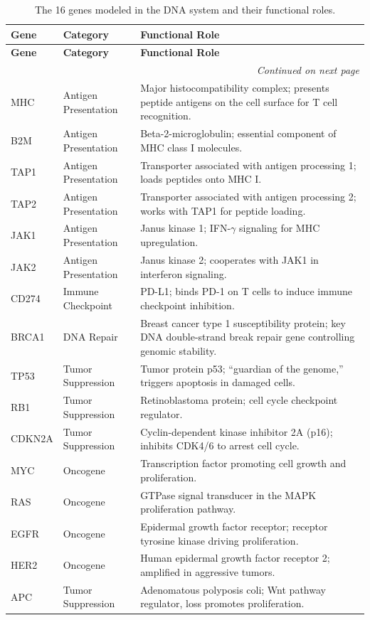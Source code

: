 \begin{longtable}{llp{7.5cm}}
\caption{The 16 genes modeled in the DNA system and their functional roles.}
\label{tab:genes} \\
\toprule
\textbf{Gene} & \textbf{Category} & \textbf{Functional Role} \\
\midrule
\endfirsthead
\toprule
\textbf{Gene} & \textbf{Category} & \textbf{Functional Role} \\
\midrule
\endhead
\midrule
\multicolumn{3}{r}{\textit{Continued on next page}} \\
\endfoot
\bottomrule
\endlastfoot
MHC    & Antigen Presentation   & Major histocompatibility complex; presents peptide antigens on the cell surface for T cell recognition. \\
B2M    & Antigen Presentation   & Beta-2-microglobulin; essential component of MHC class I molecules. \\
TAP1   & Antigen Presentation   & Transporter associated with antigen processing 1; loads peptides onto MHC I. \\
TAP2   & Antigen Presentation   & Transporter associated with antigen processing 2; works with TAP1 for peptide loading. \\
JAK1   & Antigen Presentation   & Janus kinase 1; IFN-$\gamma$ signaling for MHC upregulation. \\
JAK2   & Antigen Presentation   & Janus kinase 2; cooperates with JAK1 in interferon signaling. \\
CD274  & Immune Checkpoint      & PD-L1; binds PD-1 on T cells to induce immune checkpoint inhibition. \\
BRCA1  & DNA Repair             & Breast cancer type 1 susceptibility protein; key DNA double-strand break repair gene controlling genomic stability. \\
TP53   & Tumor Suppression      & Tumor protein p53; ``guardian of the genome,'' triggers apoptosis in damaged cells. \\
RB1    & Tumor Suppression      & Retinoblastoma protein; cell cycle checkpoint regulator. \\
CDKN2A & Tumor Suppression      & Cyclin-dependent kinase inhibitor 2A (p16); inhibits CDK4/6 to arrest cell cycle. \\
MYC    & Oncogene               & Transcription factor promoting cell growth and proliferation. \\
RAS    & Oncogene               & GTPase signal transducer in the MAPK proliferation pathway. \\
EGFR   & Oncogene               & Epidermal growth factor receptor; receptor tyrosine kinase driving proliferation. \\
HER2   & Oncogene               & Human epidermal growth factor receptor 2; amplified in aggressive tumors. \\
APC    & Tumor Suppression      & Adenomatous polyposis coli; Wnt pathway regulator, loss promotes proliferation. \\
\end{longtable}

